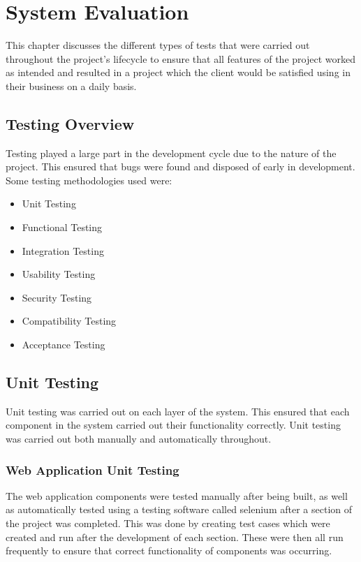 \chapter{System Evaluation}
This chapter discusses the different types of tests that were carried out throughout the project’s lifecycle to ensure that all features of the project worked as intended and resulted in a project which the client would be satisfied using in their business on a daily basis. 

\section{Testing Overview}
Testing played a large part in the development cycle due to the nature of the project. This ensured that bugs were found and disposed of early in development.\\
Some testing methodologies used were: 
\begin{itemize}
    \item Unit Testing
    \item Functional Testing
    \item Integration Testing
    \item Usability Testing
    \item Security Testing
    \item Compatibility Testing
    \item Acceptance  Testing
\end{itemize}
\newpage

\section{Unit Testing}
Unit testing was carried out on each layer of the system. This ensured that each component in the system carried out their functionality correctly. Unit testing was carried out both manually and automatically throughout.

\subsection{Web Application Unit Testing}
The web application components were tested manually after being built, as well as automatically tested using a testing software called selenium after a section of the project was completed. This was done by creating test cases which were created and run after the development of each section. These were then all run frequently to ensure that correct functionality of components was occurring.

